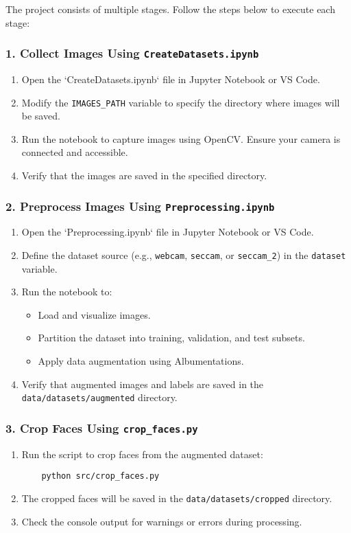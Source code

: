 \documentclass[a4paper]{feidippp}
\begin{document}
The project consists of multiple stages. Follow the steps below to execute each stage:

\subsubsection{1. Collect Images Using \texttt{CreateDatasets.ipynb}}
\begin{enumerate}
    \item Open the `CreateDatasets.ipynb` file in Jupyter Notebook or VS Code.
    \item Modify the \texttt{IMAGES\_PATH} variable to specify the directory where images will be saved.
    \item Run the notebook to capture images using OpenCV. Ensure your camera is connected and accessible.
    \item Verify that the images are saved in the specified directory.
\end{enumerate}

\subsubsection{2. Preprocess Images Using \texttt{Preprocessing.ipynb}}
\begin{enumerate}
    \item Open the `Preprocessing.ipynb` file in Jupyter Notebook or VS Code.
    \item Define the dataset source (e.g., \texttt{webcam}, \texttt{seccam}, or \texttt{seccam\_2}) in the \texttt{dataset} variable.
    \item Run the notebook to:
    \begin{itemize}
        \item Load and visualize images.
        \item Partition the dataset into training, validation, and test subsets.
        \item Apply data augmentation using Albumentations.
    \end{itemize}
    \item Verify that augmented images and labels are saved in the \texttt{data/datasets/augmented} directory.
\end{enumerate}

\subsubsection{3. Crop Faces Using \texttt{crop\_faces.py}}
\begin{enumerate}
    \item Run the script to crop faces from the augmented dataset:
    \begin{verbatim}
    python src/crop_faces.py
    \end{verbatim}
    \item The cropped faces will be saved in the \texttt{data/datasets/cropped} directory.
    \item Check the console output for warnings or errors during processing.
\end{enumerate}
\end{document}
